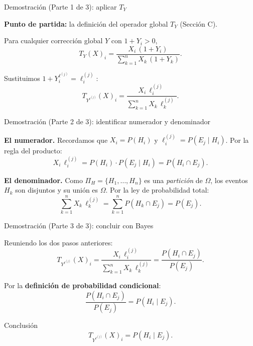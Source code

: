 \documentclass[12pt, aspectratio=169]{beamer}
\begin{document}
\begin{frame}{Demostración (Parte 1 de 3): aplicar $T_Y$}

  \textbf{Punto de partida:} la definición del operador global $T_Y$ (Sección C).

  \vspace{8pt}
  Para cualquier corrección global $Y$ con $1 + Y_i > 0$,
  \[
    T_Y(X)_i = \frac{X_i\,(1+Y_i)}{\displaystyle\sum_{k=1}^n X_k\,(1+Y_k)}.
  \]

  \vspace{6pt}
  Sustituimos $1 + Y_i^{\ell^{(j)}} = \ell_i^{(j)}$:
  \[
    T_{Y^{\ell^{(j)}}}(X)_i
    = \frac{X_i \, \ell_i^{(j)}}{\displaystyle\sum_{k=1}^n X_k \, \ell_k^{(j)}}.
  \]

\end{frame}

\begin{frame}{Demostración (Parte 2 de 3): identificar numerador y denominador}

  \textbf{El numerador.}
  Recordamos que $X_i = P(H_i)$ y $\ell_i^{(j)} = P(E_j \mid H_i)$.
  Por la regla del producto:
  \[
    X_i \, \ell_i^{(j)}
    = P(H_i) \cdot P(E_j \mid H_i)
    = P(H_i \cap E_j).
  \]

  \vspace{10pt}
  \textbf{El denominador.}
  Como $\Pi_H = \{H_1, \dots, H_n\}$ es una \emph{partición} de $\Omega$,
  los eventos $H_k$ son disjuntos y su unión es $\Omega$.
  Por la ley de probabilidad total:
  \[
    \sum_{k=1}^n X_k \, \ell_k^{(j)}
    = \sum_{k=1}^n P(H_k \cap E_j)
    = P(E_j).
  \]
\end{frame}

\begin{frame}{Demostración (Parte 3 de 3): concluir con Bayes}

  Reuniendo los dos pasos anteriores:
  \[
    T_{Y^{\ell^{(j)}}}(X)_i
    = \frac{X_i \, \ell_i^{(j)}}{\displaystyle\sum_{k=1}^n X_k \, \ell_k^{(j)}}
    = \frac{P(H_i \cap E_j)}{P(E_j)}.
  \]

  \vspace{6pt}
  Por la \textbf{definición de probabilidad condicional}:
  \[
    \frac{P(H_i \cap E_j)}{P(E_j)} = P(H_i \mid E_j).
  \]

  \vspace{8pt}
  \begin{alertblock}{Conclusión}
    \[
      \boxed{T_{Y^{\ell^{(j)}}}(X)_i = P(H_i \mid E_j).}
    \]
  \end{alertblock}
\end{frame}
\end{document}
